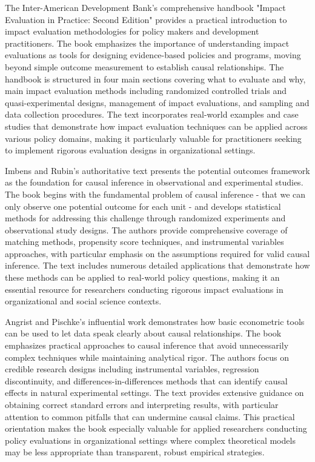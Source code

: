 \documentclass[main.tex]{subfiles}
\begin{document}
The Inter-American Development Bank's comprehensive handbook "Impact Evaluation in Practice: Second Edition" provides a practical introduction to impact evaluation methodologies for policy makers and development practitioners\parencite{iadb_impact}. The book emphasizes the importance of understanding impact evaluations as tools for designing evidence-based policies and programs, moving beyond simple outcome measurement to establish causal relationships. The handbook is structured in four main sections covering what to evaluate and why, main impact evaluation methods including randomized controlled trials and quasi-experimental designs, management of impact evaluations, and sampling and data collection procedures. The text incorporates real-world examples and case studies that demonstrate how impact evaluation techniques can be applied across various policy domains, making it particularly valuable for practitioners seeking to implement rigorous evaluation designs in organizational settings.


Imbens and Rubin's authoritative text presents the potential outcomes framework as the foundation for causal inference in observational and experimental studies\parencite{causal_inference_book}. The book begins with the fundamental problem of causal inference - that we can only observe one potential outcome for each unit - and develops statistical methods for addressing this challenge through randomized experiments and observational study designs. The authors provide comprehensive coverage of matching methods, propensity score techniques, and instrumental variables approaches, with particular emphasis on the assumptions required for valid causal inference. The text includes numerous detailed applications that demonstrate how these methods can be applied to real-world policy questions, making it an essential resource for researchers conducting rigorous impact evaluations in organizational and social science contexts.


Angrist and Pischke's influential work demonstrates how basic econometric tools can be used to let data speak clearly about causal relationships\parencite{harmless_econometrics}. The book emphasizes practical approaches to causal inference that avoid unnecessarily complex techniques while maintaining analytical rigor. The authors focus on credible research designs including instrumental variables, regression discontinuity, and differences-in-differences methods that can identify causal effects in natural experimental settings. The text provides extensive guidance on obtaining correct standard errors and interpreting results, with particular attention to common pitfalls that can undermine causal claims. This practical orientation makes the book especially valuable for applied researchers conducting policy evaluations in organizational settings where complex theoretical models may be less appropriate than transparent, robust empirical strategies.
\end{document}
